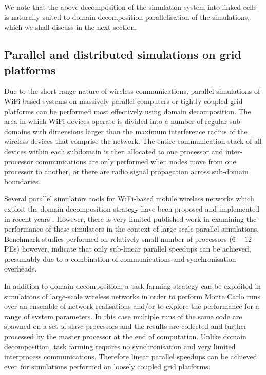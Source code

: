 \documentclass{elsart}
\begin{document}
We note that the above  decomposition of the simulation system into linked cells is naturally suited to domain decomposition parallelisation of the simulations, 
which we shall discuss in the next section. 

\subsection{Parallel and distributed simulations on grid platforms}
Due to the short-range nature of  wireless communications, parallel 
simulations of WiFi-based systems on massively parallel computers or 
tightly coupled grid platforms can be performed most effectively 
using domain decomposition. The area in which WiFi devices operate is 
divided into a number of regular sub-domains with dimensions larger than the 
maximum interference radius of the wireless devices that comprise the 
network. The entire communication stack of all devices within
each subdomain is then allocated to one processor and inter-processor 
communications are only performed when nodes move from one processor to 
another, or there are radio signal propagation across sub-domain 
boundaries. 

Several parallel simulators tools for WiFi-based mobile wireless networks 
which exploit the domain decomposition strategy have been proposed and 
implemented in recent years \cite{glomo,qualnet,vanet,conserve1}. However,
there is very limited published work in examining the 
performance of these simulators in the context of 
large-scale parallel simulations.
Benchmark studies  performed on relatively small  number of processors ($6-12$ 
PEs) however, indicate that only sub-linear parallel speedups can be achieved,
presumably due to a combination of communications and synchronisation overheads.

In addition to domain-decomposition, a task farming strategy can be exploited 
in simulations of large-scale wireless networks in 
order to perform Monte Carlo runs over an ensemble of  network realisations 
and/or to explore the performance for a range of system parameters.
In this case multiple runs of the same code are spawned 
on a set of slave  processors and the results are collected and further processed by the master processor at the end of computation. Unlike domain decomposition, task farming requires no synchronisation and very limited interprocess 
communications. Therefore linear parallel speedups can be achieved 
even for simulations performed on loosely coupled grid platforms.
\end{document}
